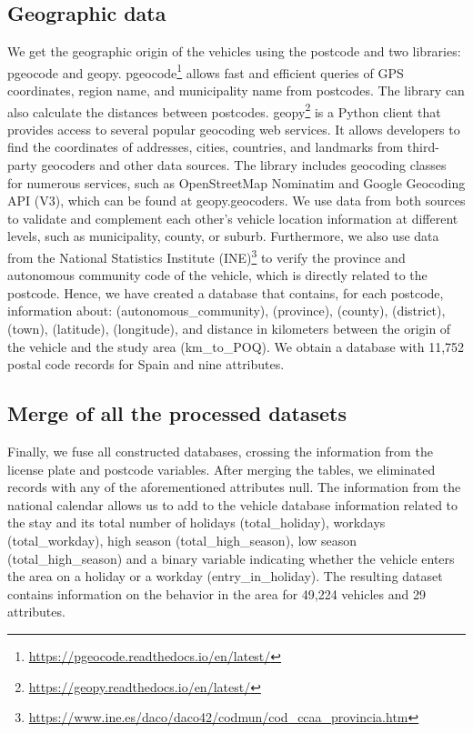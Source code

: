 \subsection*{Geographic data}

We get the geographic origin of the vehicles using the postcode and two libraries: pgeocode and geopy. pgeocode\footnote{\url{https://pgeocode.readthedocs.io/en/latest/}} allows fast and efficient queries of GPS coordinates, region name, and municipality name from postcodes. The library can also calculate the distances between postcodes. geopy\footnote{\url{https://geopy.readthedocs.io/en/latest/}} is a Python client that provides access to several popular geocoding web services. It allows developers to find the coordinates of addresses, cities, countries, and landmarks from third-party geocoders and other data sources. The library includes geocoding classes for numerous services, such as OpenStreetMap Nominatim and Google Geocoding API (V3), which can be found at geopy.geocoders. We use data from both sources to validate and complement each other's vehicle location information at different levels, such as municipality, county, or suburb. Furthermore, we also use data from the National Statistics Institute (INE)\footnote{\url{https://www.ine.es/daco/daco42/codmun/cod\_ccaa\_provincia.htm}} to verify the province and autonomous community code of the vehicle, which is directly related to the postcode. Hence, we have created a database that contains, for each postcode, information about: (autonomous\_community), (province), (county), (district), (town), (latitude), (longitude), and distance in kilometers between the origin of the vehicle and the study area (km\_to\_POQ). We obtain a database with 11,752 postal code records for Spain and nine attributes.

\subsection*{Merge of all the processed datasets}

Finally, we fuse all constructed databases, crossing the information from the license plate and postcode variables. After merging the tables, we eliminated records with any of the aforementioned attributes null. The information from the national calendar allows us to add to the vehicle database information related to the stay and its total number of holidays (total\_holiday), workdays (total\_workday), high season (total\_high\_season), low season (total\_high\_season) and a binary variable indicating whether the vehicle enters the area on a holiday or a workday (entry\_in\_holiday). The resulting dataset contains information on the behavior in the area for 49,224 vehicles and 29 attributes. 

